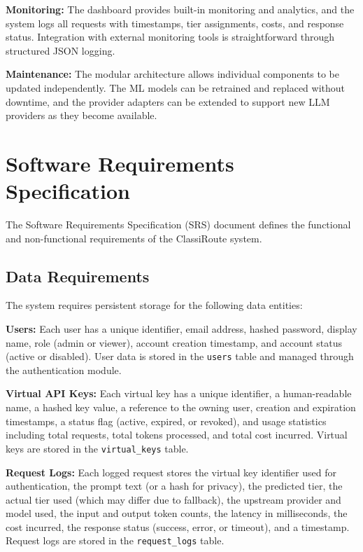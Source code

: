 \documentclass[oneside,12pt,a4paper]{report}
\begin{document}
\textbf{Monitoring:} The dashboard provides built-in monitoring and analytics, and the system logs all requests with timestamps, tier assignments, costs, and response status. Integration with external monitoring tools is straightforward through structured JSON logging.

\textbf{Maintenance:} The modular architecture allows individual components to be updated independently. The ML models can be retrained and replaced without downtime, and the provider adapters can be extended to support new LLM providers as they become available.

\section{Software Requirements Specification}

The Software Requirements Specification (SRS) document defines the functional and non-functional requirements of the ClassiRoute system.

\subsection{Data Requirements}

The system requires persistent storage for the following data entities:

\textbf{Users:} Each user has a unique identifier, email address, hashed password, display name, role (admin or viewer), account creation timestamp, and account status (active or disabled). User data is stored in the \texttt{users} table and managed through the authentication module.

\textbf{Virtual API Keys:} Each virtual key has a unique identifier, a human-readable name, a hashed key value, a reference to the owning user, creation and expiration timestamps, a status flag (active, expired, or revoked), and usage statistics including total requests, total tokens processed, and total cost incurred. Virtual keys are stored in the \texttt{virtual\_keys} table.

\textbf{Request Logs:} Each logged request stores the virtual key identifier used for authentication, the prompt text (or a hash for privacy), the predicted tier, the actual tier used (which may differ due to fallback), the upstream provider and model used, the input and output token counts, the latency in milliseconds, the cost incurred, the response status (success, error, or timeout), and a timestamp. Request logs are stored in the \texttt{request\_logs} table.
\end{document}
